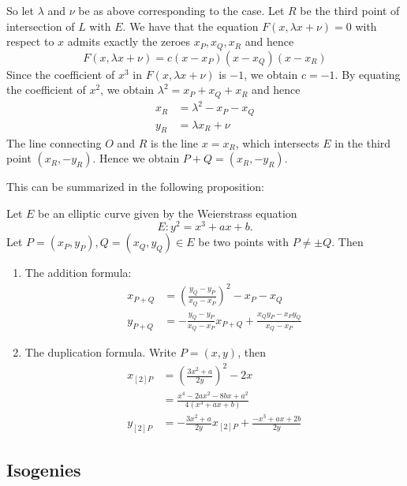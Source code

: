 So let $\lambda$ and $\nu$ be as above corresponding to the case.
Let $R$ be the third point of intersection of $L$ with $E$.
We have that the equation $F(x, \lambda x + \nu) = 0$ with respect to $x$
admits exactly the zeroes $x_P, x_Q, x_R$ and hence
\begin{equation*}
	F(x, \lambda x + \nu) = c(x - x_P)(x - x_Q)(x - x_R)
\end{equation*}
Since the coefficient of $x^3$ in $F(x, \lambda x + \nu)$ is $-1$, we obtain
$c = -1$. By equating the coefficient of $x^2$, we obtain
$\lambda^2 = x_P + x_Q + x_R$ and hence
\begin{align*}
	x_R &= \lambda^2 - x_P - x_Q\\
	y_R &= \lambda x_R + \nu
\end{align*}
The line connecting $O$ and $R$ is the line $x = x_R$, which intersects $E$
in the third point $(x_R, -y_R)$.
Hence we obtain $P + Q = (x_R, -y_R)$.

This can be summarized in the following proposition:
\begin{proposition}
	Let $E$ be an elliptic curve given by the Weierstrass equation
	\begin{equation*}
		E: y^2 = x^3 + ax + b.
	\end{equation*}
	Let $P = (x_P, y_P), Q = (x_Q, y_Q) \in E$ be two points with $P \neq \pm Q$.
	Then 
	\begin{enumerate}
		\item The addition formula:
			\begin{align*}
				x_{P + Q} &= \left( \frac{y_Q - y_P}{x_Q - x_P} \right)^2
				- x_P - x_Q\\
				y_{P + Q} &= -\frac{y_Q - y_P}{x_Q - x_P}x_{P+Q} + \frac{x_Qy_P -
				x_Py_Q}{x_Q - x_P}
			\end{align*}
		\item The duplication formula. Write $P = (x, y)$, then
			\begin{align*}
				x_{[2]P} &= \left( \frac{3x^2 + a}{2y} \right)^2
				- 2x\\
				&= \frac{x^4 - 2ax^2 - 8bx + a^2}{4(x^3 + ax + b)}\\
				y_{[2]P} &= - \frac{3x^2 + a}{2y}x_{[2]P}
				+ \frac{-x^3 + ax + 2b}{2y}
			\end{align*}
	\end{enumerate}
\end{proposition}

\subsection{Isogenies}

